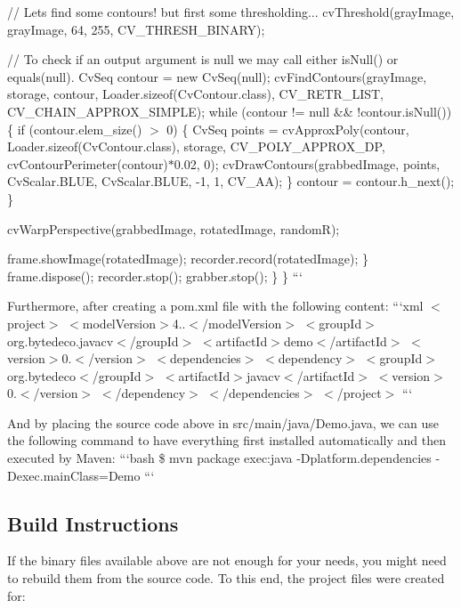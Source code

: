 // Let\textquotesingle{}s find some contours! but first some thresholding... cv\+Threshold(gray\+Image, gray\+Image, 64, 255, C\+V\+\_\+\+T\+H\+R\+E\+S\+H\+\_\+\+B\+I\+N\+A\+R\+Y);

// To check if an output argument is null we may call either is\+Null() or equals(null). Cv\+Seq contour = new Cv\+Seq(null); cv\+Find\+Contours(gray\+Image, storage, contour, Loader.\+sizeof(Cv\+Contour.\+class), C\+V\+\_\+\+R\+E\+T\+R\+\_\+\+L\+I\+S\+T, C\+V\+\_\+\+C\+H\+A\+I\+N\+\_\+\+A\+P\+P\+R\+O\+X\+\_\+\+S\+I\+M\+P\+L\+E); while (contour != null \&\& !contour.is\+Null()) \{ if (contour.\+elem\+\_\+size() $>$ 0) \{ Cv\+Seq points = cv\+Approx\+Poly(contour, Loader.\+sizeof(Cv\+Contour.\+class), storage, C\+V\+\_\+\+P\+O\+L\+Y\+\_\+\+A\+P\+P\+R\+O\+X\+\_\+\+D\+P, cv\+Contour\+Perimeter(contour)$\ast$0.02, 0); cv\+Draw\+Contours(grabbed\+Image, points, Cv\+Scalar.\+B\+L\+U\+E, Cv\+Scalar.\+B\+L\+U\+E, -\/1, 1, C\+V\+\_\+\+A\+A); \} contour = contour.\+h\+\_\+next(); \}

cv\+Warp\+Perspective(grabbed\+Image, rotated\+Image, random\+R);

frame.\+show\+Image(rotated\+Image); recorder.\+record(rotated\+Image); \} frame.\+dispose(); recorder.\+stop(); grabber.\+stop(); \} \} ```

Furthermore, after creating a {\ttfamily pom.\+xml} file with the following content\+: ```xml $<$project$>$ $<$model\+Version$>$4..$<$/model\+Version$>$ $<$group\+Id$>$org.\+bytedeco.\+javacv$<$/group\+Id$>$ $<$artifact\+Id$>$demo$<$/artifact\+Id$>$ $<$version$>$0.$<$/version$>$ $<$dependencies$>$ $<$dependency$>$ $<$group\+Id$>$org.\+bytedeco$<$/group\+Id$>$ $<$artifact\+Id$>$javacv$<$/artifact\+Id$>$ $<$version$>$0.$<$/version$>$ $<$/dependency$>$ $<$/dependencies$>$ $<$/project$>$ ```

And by placing the source code above in {\ttfamily src/main/java/\+Demo.\+java}, we can use the following command to have everything first installed automatically and then executed by Maven\+: ```bash \$ mvn package exec\+:java -\/\+Dplatform.\+dependencies -\/\+Dexec.\+main\+Class=Demo ```

\subsection*{Build Instructions }

If the binary files available above are not enough for your needs, you might need to rebuild them from the source code. To this end, the project files were created for\+:


